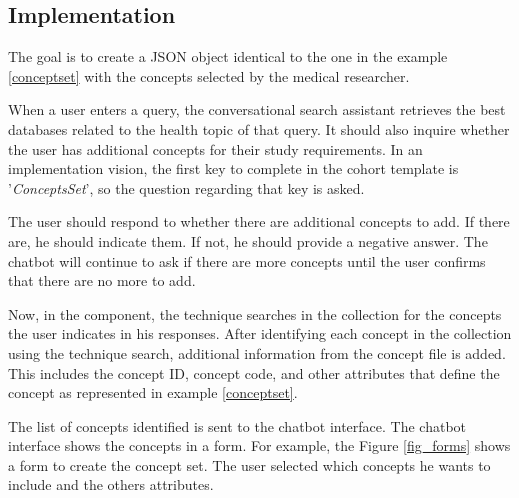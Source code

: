 \subsection{Implementation}




The goal is to create a JSON object identical to the one in the example \ref{conceptset} with the concepts selected by the medical researcher.

When a user enters a query, the conversational search assistant retrieves the best databases related to the health topic of that query. It should also inquire whether the user has additional concepts for their study requirements. In an implementation vision, the first key to complete in the cohort template is '\textit{ConceptsSet}', so the question regarding that key is asked.

The user should respond to whether there are additional concepts to add. If there are, he should indicate them. If not, he should provide a negative answer. The chatbot will continue to ask if there are more concepts until the user confirms that there are no more to add.

Now, in the {\ir} component, the {\bm} technique searches in the collection for the concepts the user indicates in his responses. After identifying each concept in the collection using the {\ir} technique search, additional information from the concept file is added. This includes the concept ID, concept code, and other attributes that define the concept as represented in example \ref{conceptset}.

The list of concepts identified is sent to the chatbot interface. The chatbot interface shows the concepts in a form. For example, the Figure \ref{fig_forms} shows a form to create the concept set. The user selected which concepts he wants to include and the others attributes.

